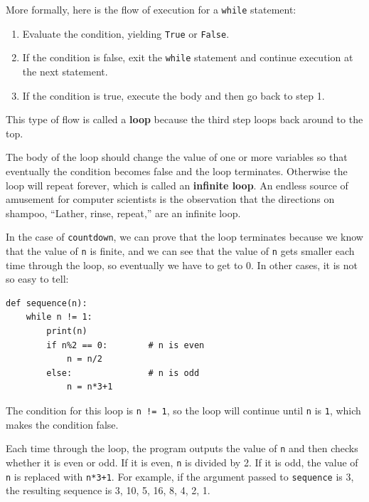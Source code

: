 \documentclass[10pt]{book}
\begin{document}

More formally, here is the flow of execution for a {\tt while} statement:

\begin{enumerate}

\item Evaluate the condition, yielding {\tt True} or {\tt False}.

\item If the condition is false, exit the {\tt while} statement
and continue execution at the next statement.

\item If the condition is true, execute the
body and then go back to step 1.

\end{enumerate}

This type of flow is called a {\bf loop} because the third step
loops back around to the top.  


The body of the loop should change the value of one or more variables
so that eventually the condition becomes false and the loop
terminates.  Otherwise the loop will repeat forever, which is called
an {\bf infinite loop}.  An endless source of amusement for computer
scientists is the observation that the directions on shampoo,
``Lather, rinse, repeat,'' are an infinite loop.


In the case of {\tt countdown}, we can prove that the loop
terminates because we know that the value of {\tt n} is finite, and we
can see that the value of {\tt n} gets smaller each time through the
loop, so eventually we have to get to 0.  In other
cases, it is not so easy to tell:

\beforeverb
\begin{verbatim}
def sequence(n):
    while n != 1:
        print(n)
        if n%2 == 0:        # n is even
            n = n/2
        else:               # n is odd
            n = n*3+1
\end{verbatim}
\afterverb
%
The condition for this loop is {\tt n != 1}, so the loop will continue
until {\tt n} is {\tt 1}, which makes the condition false.

Each time through the loop, the program outputs the value of {\tt n}
and then checks whether it is even or odd.  If it is even, {\tt n} is 
divided by 2.  If it is odd, the value of {\tt n} is replaced with
{\tt n*3+1}. For example, if the argument passed
to {\tt sequence} is 3, the resulting sequence is 3, 10, 5, 16, 8, 4, 2, 1.
\end{document}
